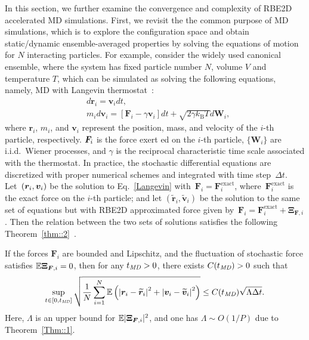 In this section, we further examine the convergence and complexity of RBE2D accelerated MD simulations. 
First, we revisit the the common purpose of MD simulations, which is to explore the configuration space and obtain static/dynamic ensemble-averaged properties by solving the equations of motion for $N$ interacting particles.
For example, consider the widely used canonical ensemble, where the system has fixed particle number $N$, volume $V$ and temperature $T$, which can be simulated as solving the following equations, namely, MD with Langevin thermostat~\cite{frenkel2023understanding}:
\begin{equation}\label{Langevin}
    \begin{aligned}
        & d \bm{r}_i=\bm{v}_i d t, \\
        & m_i d \bm{v}_i=\left[\bm{F}_i-\gamma \bm{v}_i\right] d t+\sqrt{2 \gamma k_{\mathrm{B}} T} d \bm{W}_i,
    \end{aligned}
\end{equation}
where $\bm{r}_i$, $m_i$, and $\bm{v}_i$ represent the position, mass, and velocity of the $i$-th particle, respectively. $\boldsymbol{F}_i$ is the force exert {ed} on the $i$-th particle, $\{\bm{W}_i\}$ are i.i.d.~Wiener processes, and $\gamma$ is the reciprocal characteristic time scale associated with the thermostat.
In practice, the stochastic differential equations are discretized with proper numerical schemes and integrated with time step~$\Delta t$.
Let~$(\boldsymbol{r}_i, \boldsymbol{v}_i)$ be the solution to Eq.~\eqref{Langevin} with~$\bm{F}_i = \bm{F}^{\text{exact}}_i$, where~$\bm{F}^{\text{exact}}_i$ is the exact force on the $i$-th particle; and let $(\widetilde{\bm{r}}_i,\widetilde{\bm{v}}_i)$ be the solution to the same set of equations but with RBE2D approximated force given by~$\bm{F}_i = \bm{F}^{\text{exact}}_i + \bm{\Xi}_{\bm{F},i}$.
Then the relation between the two sets of solutions satisfies the following Theorem~\ref{thm::2}~\cite{jin2021convergence}.

\begin{thm}\label{thm::2}
If the forces $\bm{F}_i$ are bounded and Lipschitz, and the fluctuation of stochastic force satisfies $\mathbb{E}\boldsymbol{\Xi}_{\boldsymbol{F},i}=0$, then for any $t_{\emph{MD}}>0$, there exists $C(t_{\emph{MD}})>0$ such that
\begin{equation}\label{eq::Convergence}
\sup _{t \in[0, t_{\emph{MD}}]} \sqrt{\frac{1}{N} \sum_{i=1}^N \mathbb{E}\left(\left|\bm{r}_i-\widetilde{\bm{r}}_i\right|^2+\left|\bm{v}_i-\widetilde{\bm{v}}_i\right|^2\right)} \leq C(t_{\emph{MD}}) \sqrt{\Lambda \Delta t}. %
\end{equation}
 {Here, $\Lambda$ is an upper bound for $\mathbb{E}|\boldsymbol{\Xi}_{\boldsymbol{F},i}|^2$, and one has $\Lambda\sim O(1/P)$ due to Theorem~\ref{Thm::1}.} 
\end{thm}

